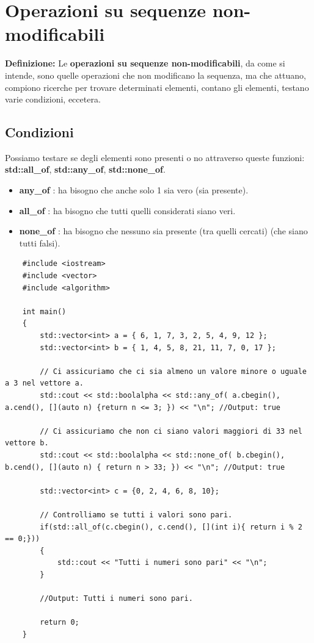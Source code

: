
\newpage

\section{Operazioni su sequenze non-modificabili}

\textsf{\small \textbf{Definizione: } Le \textbf{operazioni su sequenze non-modificabili}, da come si intende, sono quelle operazioni che non modificano la sequenza, ma che attuano, compiono ricerche per trovare determinati elementi, contano gli elementi, testano varie condizioni, eccetera.} \\

\subsection{Condizioni}

\textsf{\small Possiamo testare se degli elementi sono presenti o no attraverso queste funzioni: \textbf{std::all\_of}, \textbf{std::any\_of}, \textbf{std::none\_of}.} \\

\begin{itemize}
	\item \textsf{\small \textbf{any\_of} : ha bisogno che anche solo 1 sia vero (sia presente).}
	\item \textsf{\small \textbf{all\_of} : ha bisogno che tutti quelli considerati siano veri.}
	\item \textsf{\small \textbf{none\_of} : ha bisogno che nessuno sia presente (tra quelli cercati) (che siano tutti falsi).}
\end{itemize}

\begin{lstlisting}
	#include <iostream>
	#include <vector>
	#include <algorithm>
	
	int main()
	{
		std::vector<int> a = { 6, 1, 7, 3, 2, 5, 4, 9, 12 };
		std::vector<int> b = { 1, 4, 5, 8, 21, 11, 7, 0, 17 };
		
		// Ci assicuriamo che ci sia almeno un valore minore o uguale a 3 nel vettore a.
		std::cout << std::boolalpha << std::any_of( a.cbegin(), a.cend(), [](auto n) {return n <= 3; }) << "\n"; //Output: true
		
		// Ci assicuriamo che non ci siano valori maggiori di 33 nel vettore b.
		std::cout << std::boolalpha << std::none_of( b.cbegin(), b.cend(), [](auto n) { return n > 33; }) << "\n"; //Output: true
		
		std::vector<int> c = {0, 2, 4, 6, 8, 10};
		
		// Controlliamo se tutti i valori sono pari.
		if(std::all_of(c.cbegin(), c.cend(), [](int i){ return i % 2 == 0;}))
		{
			std::cout << "Tutti i numeri sono pari" << "\n";
		}
	
		//Output: Tutti i numeri sono pari.
		
		return 0;
	}	
\end{lstlisting}

